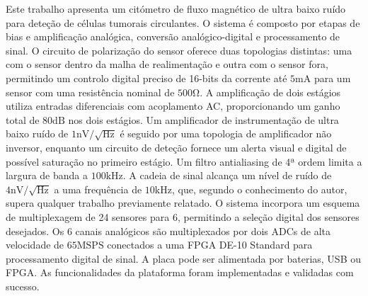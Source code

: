 
\noindent
Este trabalho apresenta um citómetro de fluxo magnético de ultra baixo ruído para deteção de células tumorais circulantes. O sistema é composto por etapas de bias e amplificação analógica, conversão analógico-digital e processamento de sinal. O circuito de polarização do sensor oferece duas topologias distintas: uma com o sensor dentro da malha de realimentação e outra com o sensor fora, permitindo um controlo digital preciso de 16-bits da corrente até $\mathrm{5mA}$ para um sensor com uma resistência nominal de $\mathrm{500\Omega}$. A amplificação de dois estágios utiliza entradas diferenciais com acoplamento AC, proporcionando um ganho total de $\mathrm{80dB}$ nos dois estágios. Um amplificador de instrumentação de ultra baixo ruído de $\mathrm{1nV/\sqrt{Hz}}$ é seguido por uma topologia de amplificador não inversor, enquanto um circuito de deteção fornece um alerta visual e digital de possível saturação no primeiro estágio. Um filtro antialiasing de 4ª ordem limita a largura de banda a $\mathrm{100kHz}$. A cadeia de sinal alcança um nível de ruído de $\mathrm{4nV/\sqrt{Hz}}$ a uma frequência de $\mathrm{10kHz}$, que, segundo o conhecimento do autor, supera qualquer trabalho previamente relatado. O sistema incorpora um esquema de multiplexagem de 24 sensores para 6, permitindo a seleção digital dos sensores desejados. Os 6 canais analógicos são multiplexados por dois ADCs de alta velocidade de $\mathrm{65MSPS}$ conectados a uma FPGA DE-10 Standard para processamento digital de sinal. A placa pode ser alimentada por baterias, USB ou FPGA. As funcionalidades da plataforma foram implementadas e validadas com sucesso.